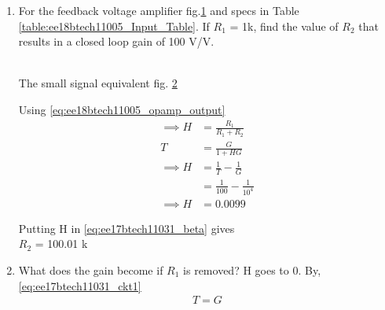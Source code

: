 \begin{enumerate}[label=\thesection.\arabic*.,ref=\thesection.\theenumi]
\item For the feedback voltage amplifier fig.\ref{fig:Original ckt} and specs in Table \ref{table:ee18btech11005_Input_Table}. If $R_{1}$ = 1k\ohm , find the value of $R_{2}$ that results in a closed loop gain of 100 V/V.

\begin{figure}[!ht]
	\begin{center}
			\resizebox{\columnwidth}{!}{}
	\end{center}
\caption{}
\label{fig:Original ckt}
\end{figure}

\begin{table}[!ht]
\centering

\caption{}
\label{table:ee18btech11005_Input_Table}
\end{table}

\\
\solution The small signal equivalent fig. \ref{fig:small ckt}
\begin{figure}[!ht]
	\begin{center}
			\resizebox{\columnwidth}{!}{}
	\end{center}
\caption{}
\label{fig:small ckt}
\end{figure}

Using \ref{eq:ee18btech11005_opamp_output}
\begin{align}
 \implies H &= \frac{R_{1}}{R_{1}+R_{2}}
\label{eq:ee17btech11031_beta}\\
T &= \frac{G}{1+ HG}\\
\implies H &= \frac{1}{T} - \frac{1}{G}
\label{eq:ee17btech11031_ckt1}\\
&= \frac{1}{100} - \frac{1}{10^4}\\
\implies H &= 0.0099
\end{align}

Putting H in \eqref{eq:ee17btech11031_beta} gives\\
\implies $R_2$ = 100.01 k\ohm

\item What does the gain become if $R_1$ is removed?
\solution H goes to 0. By, \ref{eq:ee17btech11031_ckt1}
\begin{align}
    T = G
\end{align}
\end{enumerate}

